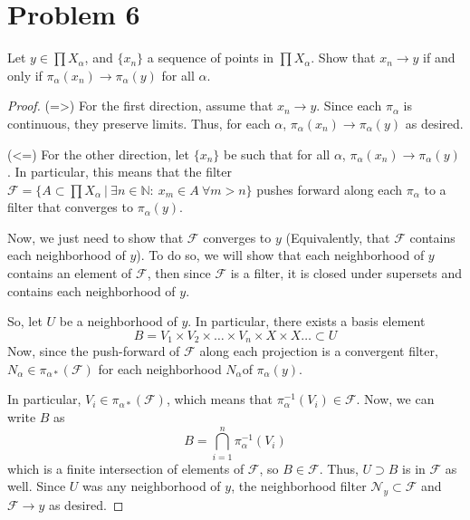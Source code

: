 \documentclass[fontsize=11pt]{scrartcl} %
\numberwithin{equation}{section} %
\numberwithin{figure}{section} %
\numberwithin{table}{section} %
\newcommand{\N}{\mathbb{N}}
\begin{document}
\section*{Problem 6}
Let $y\in\prod X_{\alpha}$, and $\{x_n\}$ a sequence of points in $\prod X_{\alpha}$.
Show that $x_n\to y$ if and only if $\pi_{\alpha}(x_n)\to\pi_{\alpha}(y)$ for all $\alpha$.
\\
\begin{proof}
(=>) For the first direction, assume that $x_n\to y$. Since each $\pi_{\alpha}$ is continuous,
they preserve limits. Thus, for each $\alpha$, $\pi_{\alpha}(x_n)\to\pi_{\alpha}(y)$ as
desired.

(<=) For the other direction, let $\{x_n\}$ be such that for all $\alpha$, $\pi_{\alpha}(x_n)\to\pi_{\alpha}(y)$.
In particular, this means that the filter $\mathscr{F} = \{A\subset \prod X_{\alpha}\ |\ \exists n\in\N:\ x_m\in A\ \forall m>n\}$
pushes forward along each $\pi_{\alpha}$ to a filter that converges to $\pi_{\alpha}(y)$.

Now, we just need to show that $\mathscr{F}$ converges to $y$ (Equivalently, that $\mathscr{F}$
contains each neighborhood of $y$). To do so, we will show that each neighborhood of
$y$ contains an element of $\mathscr{F}$, then since $\mathscr{F}$ is a filter,
it is closed under supersets and contains each neighborhood of $y$.

So, let $U$ be a neighborhood of $y$. In particular, there exists a basis element
\[
B = V_1\times V_2\times \ldots \times V_n\times X\times X\ldots \subset U
\]
Now, since the push-forward of $\mathscr{F}$ along each projection is a convergent filter,
$N_{\alpha}\in\pi_{\alpha *}(\mathscr{F})$ for each neighborhood $N_{\alpha}$of $\pi_{\alpha}(y)$.

In particular, $V_i\in\pi_{\alpha *}(\mathscr{F})$, which means that $\pi^{-1}_{\alpha}(V_i)\in\mathscr{F}$.
Now, we can write $B$ as
\[
B = \bigcap_{i=1}^n \pi_{\alpha}^{-1}(V_i)
\]
which is a finite intersection of elements of $\mathscr{F}$, so $B\in\mathscr{F}$. Thus,
$U\supset B$ is in $\mathscr{F}$ as well. Since $U$ was any neighborhood of $y$, the
neighborhood filter $\mathscr{N}_y\subset\mathscr{F}$ and $\mathscr{F}\to y$ as desired.
\end{proof}
\end{document}
